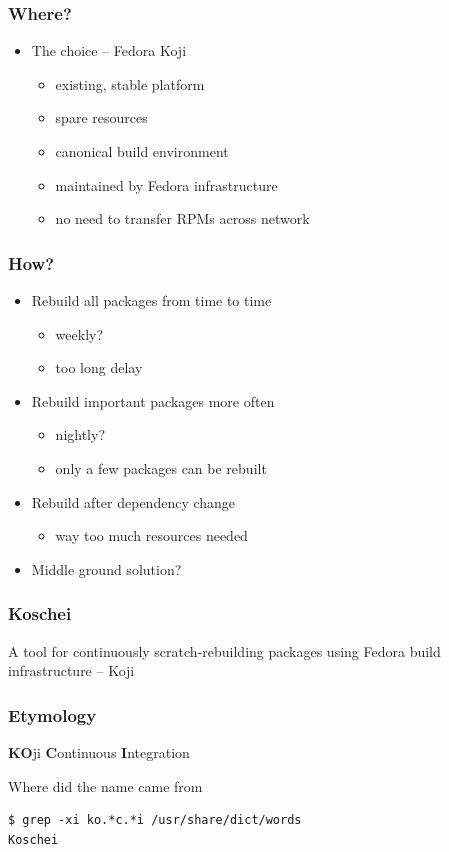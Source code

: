 \documentclass[pdftex,unicode,xcolor=table]{beamer}
\begin{document}
\begin{frame}
  \frametitle{Where?}
  \begin{itemize}
  \item The choice -- Fedora Koji
    \begin{itemize}
      \item existing, stable platform
      \item spare resources
      \item canonical build environment
      \item maintained by Fedora infrastructure
      \item no need to transfer RPMs across network
    \end{itemize}
  \end{itemize}
\end{frame}

\begin{frame}
  \frametitle{How?}
  \begin{itemize}
  \item Rebuild all packages from time to time
    \begin{itemize}
      \item weekly?
      \item too long delay
    \end{itemize}
  \item Rebuild important packages more often
    \begin{itemize}
      \item nightly?
      \item only a few packages can be rebuilt
    \end{itemize}
  \item Rebuild after dependency change
    \begin{itemize}
      \item way too much resources needed
    \end{itemize}
  \item Middle ground solution?
  \end{itemize}
\end{frame}


\Large
\begin{frame}
  \frametitle{Koschei}
  A tool for continuously scratch-rebuilding
  packages using Fedora build infrastructure -- Koji
\end{frame}

\large
\begin{frame}[fragile]
  \frametitle{Etymology}
\textbf{KO}ji \textbf{C}ontinuous \textbf{I}ntegration
\vspace{30 pt}
\begin{block}{Where did the name came from}
\begin{verbatim}
$ grep -xi ko.*c.*i /usr/share/dict/words
Koschei
\end{verbatim}
\end{block}
\end{frame}
\end{document}
